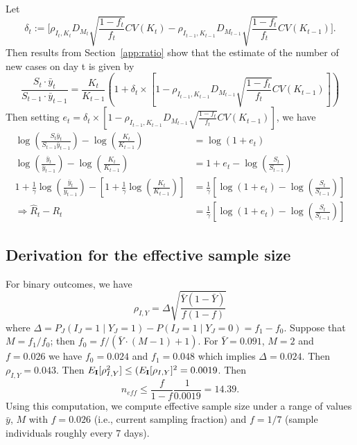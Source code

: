 \documentclass[12pt]{article}
\def\I{{\bf I}}
\def\bary{{\bar y}}
\begin{document}
Let
$$
\delta_t := \bigg[ \rho_{I_t,K_t} D_{M_t} \sqrt{\frac{1-f_t}{f_t}} CV (K_t)  -\rho_{I_{t-1},K_{t-1}} D_{M_{t-1}} \sqrt{\frac{1-f_t}{f_t}} CV (K_{t-1}) \bigg].
$$
Then results from Section~\ref{app:ratio} show that the estimate of the number of new cases on day t is given by
$$
\frac{S_t \cdot \bar y_t}{S_{t-1} \cdot \bar y_{t-1}} =
\frac{K_t}{K_{t-1}} \left( 1 + \delta_t \times \left[ 1 - \rho_{I_{t-1},K_{t-1}} D_{M_{t-1}} \sqrt{\frac{1-f_t}{f_t}} CV (K_{t-1}) \right] \right)
$$
Then setting $e_t = \delta_t \times [1 - \rho_{I_{t-1},K_{t-1}} D_{M_{t-1}} \sqrt{\frac{1-f_t}{f_t}} CV (K_{t-1}) ]$, we have
$$
\begin{aligned}
\log \left( \frac{S_t \bar y_t}{S_{t-1} \bar y_{t-1}} \right) - \log \left( \frac{K_t}{K_{t-1}} \right) &= \log (1 + e_t) \\
\log \left( \frac{\bar y_t}{\bar y_{t-1}} \right) - \log \left( \frac{K_t}{K_{t-1}} \right) &= 1 + e_t - \log \left( \frac{S_t}{S_{t-1}} \right) \\
1 + \frac{1}{\gamma} \log \left( \frac{\bar y_t}{\bar y_{t-1}} \right) - \left[ 1 + \frac{1}{\gamma} \log \left( \frac{K_t}{K_{t-1}} \right) \right] &= \frac{1}{\gamma} \left[ \log \left( 1 + e_t \right) - \log \left( \frac{S_{t}}{S_{t-1}} \right) \right] \\
\Rightarrow \hat R_t - R_t &= \frac{1}{\gamma} \left[ \log \left( 1 + e_t \right) - \log \left( \frac{S_{t}}{S_{t-1}} \right) \right]
\end{aligned}
$$



\subsection*{Derivation for the effective sample size}
\label{section:effss}

For binary outcomes, we have
\begin{equation} \label{eq:binaryrho}
\rho_{I,Y} = \Delta \sqrt{\frac{\bar Y (1 - \bar Y)}{f (1-f)} }
\end{equation}
where $\Delta = P_J (I_J = 1 \mid Y_J = 1) - P(I_J = 1 \mid Y_J = 0) = f_1 - f_0$.  Suppose that $M = f_1/f_0$; then
$f_0 = f / (\bar Y \cdot (M-1) + 1)$.  For $\bar Y = 0.091$, $M = 2$ and $f = 0.026$ we have $f_0 = 0.024$ and $f_1 = 0.048$ which implies $\Delta = 0.024$.
Then $\rho_{I,Y} = 0.043$.  Then $E_{\I} [ \rho_{I,Y}^2 ] \leq (E_{\I} [\rho_{I,Y} ]^2 = 0.0019$.  Then
$$
n_{eff} \leq \frac{f}{1-f} \frac{1}{0.0019} = 14.39.
$$
Using this computation, we compute effective sample size under a range of values $\bary$, $M$ with $f = 0.026$ (i.e., current sampling fraction) and $f =1/7$ (sample individuals roughly every 7 days).
\end{document}

